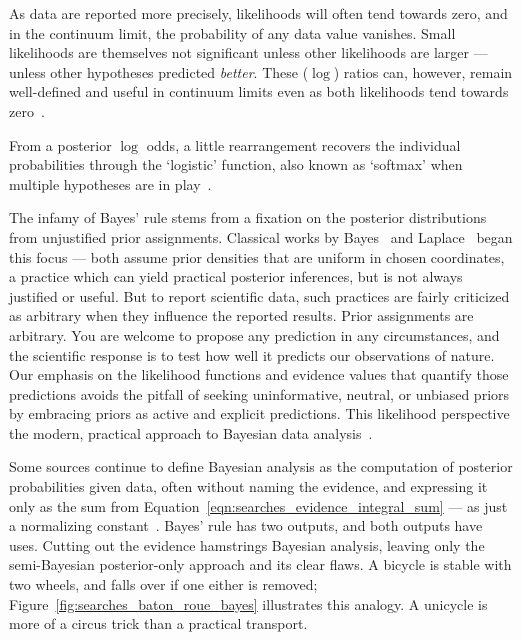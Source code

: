As data are reported more precisely, likelihoods will often tend towards zero,
and in the continuum limit, the probability of any data value vanishes.
Small likelihoods are themselves not significant unless other likelihoods
are larger --- unless other hypotheses predicted \emph{better}.
These ($\log$) ratios can, however, remain well-defined and useful in continuum
limits even as both likelihoods tend towards
zero~\cite{billingsley2008probability}.

From a posterior $\log$ odds, a little rearrangement recovers the individual
probabilities through the `logistic' function, also known as
`softmax' when multiple hypotheses are in play~\cite{MurphyKevinP.2012Mlap}.

The infamy of Bayes' rule stems from a fixation on the posterior distributions
from unjustified prior assignments.
Classical works by
Bayes~\cite{bayes1763lii} and
Laplace~\cite{laplace1774stigler} began this focus ---
both assume prior densities that are uniform in chosen coordinates, a practice
which can yield practical posterior inferences,
but is not always justified or useful.
But to report scientific data, such practices are fairly criticized as
arbitrary when they influence the reported results.
Prior assignments are arbitrary.
You are welcome to propose any prediction in any circumstances, and the
scientific response is to test how well it predicts our observations of nature.
Our emphasis on the likelihood functions and evidence values that quantify
those predictions avoids the pitfall of seeking uninformative, neutral, or
unbiased priors by embracing priors as active and explicit predictions.
This likelihood perspective the modern, practical approach to Bayesian data
analysis~\cite{
mackay2003information,
skilling2004nested,
skilling2006nested,
sivia2006data,
skilling2010foundations
}.

Some sources continue to define Bayesian analysis as the computation of
posterior probabilities given data, often without naming the evidence, and
expressing it only as the sum from
Equation~\ref{eqn:searches_evidence_integral_sum}
--- as just a normalizing constant~\cite{
Neyman1937Outline,
gelman1995bayesian,
gelman2008objections,
DAgostini:1994fjx,
DAgostini:2010hil,
cowan1998statistical,
pdg2022ynf
}.
Bayes' rule has two outputs, and both outputs have uses.
Cutting out the evidence hamstrings Bayesian analysis, leaving only the
semi-Bayesian posterior-only approach and its clear flaws.
A bicycle is stable with two wheels, and falls over if one either
is removed;
Figure~\ref{fig:searches_baton_roue_bayes} illustrates this analogy.
A unicycle is more of a circus trick than a practical transport.

